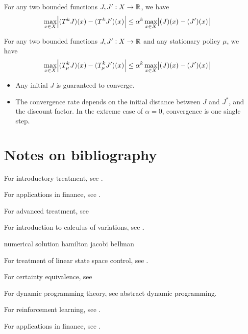\begin{refsection}
\begin{corollary}\cite[18]{bertsekas2012dynamic2}
	For any two bounded functions $J,J':X\to \mathbb{R}$, we have
	$$\max_{x\in X} \abs{(T^k J)(x) -(T^k J')(x) } \leq \alpha^k \max_{x\in X} \abs{(J)(x) -(J')(x) }$$
\end{corollary}

\begin{corollary}\cite[18]{bertsekas2012dynamic2}
	For any two bounded functions $J,J':X\to \mathbb{R}$ and any stationary policy $\mu$, we have
	$$\max_{x\in X} \abs{(T^k_\mu J)(x) -(T^k_\mu J')(x) } \leq \alpha^k \max_{x\in X} \abs{(J)(x) -(J')(x) }$$
\end{corollary}


\begin{remark}\hfill
	\begin{itemize}
		\item Any initial $J$ is guaranteed to converge.
		\item The convergence rate depends on the initial distance between $J$ and $J^*$, and the discount factor. In the extreme case of $\alpha = 0$, convergence is one single step.
	\end{itemize}	
\end{remark}

\section{Notes on bibliography}
For introductory treatment, see \cite{luenberger1979introduction}\cite{kirk2012optimal}.

For applications in finance, see \cite{miranda2004applied}.

For advanced treatment, see \cite{fleming2006controlled}

For introduction to calculus of variations, see \cite{kirk2012optimal}.

numerical solution hamilton jacobi bellman

For treatment of linear state space control, see \cite{williams2007linear}.

For certainty equivalence, see \cite[160]{bertsekas2012dynamic}

For dynamic programming theory, see abstract dynamic programming.

For reinforcement learning, see \cite{wiering2012reinforcement}.

For applications in finance, see \cite{chang2004stochastic}\cite{pham2009continuous}\cite{bertsekas2012dynamic}.



\end{refsection}
